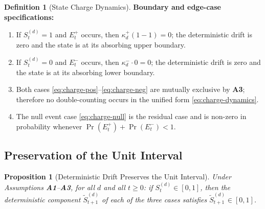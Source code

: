 \documentclass[12pt,openany]{book}
\numberwithin{equation}{chapter}
\theoremstyle{plain}
\newtheorem{proposition}[theorem]{Proposition}
\theoremstyle{definition}
\newtheorem{definition}[theorem]{Definition}
\theoremstyle{remark}
\def\mathcal#1{#1}%
\begin{document}
\begin{definition}[State Charge Dynamics]
\medskip
\noindent\textbf{Boundary and edge-case specifications:}
\begin{enumerate}
  \item If $\mathcal{S}_t^{(d)} = 1$ and $E_t^{+}$ occurs, then
    $\kappa_d^{+}(1 - 1) = 0$; the deterministic drift is zero
    and the state is at its absorbing upper boundary.
  \item If $\mathcal{S}_t^{(d)} = 0$ and $E_t^{-}$ occurs, then
    $\kappa_d^{-} \cdot 0 = 0$; the deterministic drift is zero
    and the state is at its absorbing lower boundary.
  \item Both cases \ref{eq:charge-pos}--\ref{eq:charge-neg} are
    mutually exclusive by \textbf{A3}; therefore no double-counting
    occurs in the unified form \eqref{eq:charge-dynamics}.
  \item The null event case \eqref{eq:charge-null} is the residual
    case and is non-zero in probability whenever
    $\Pr(E_t^{+}) + \Pr(E_t^{-}) < 1$.
\end{enumerate}
\end{definition}

\subsection{Preservation of the Unit Interval}
\label{subsec:unit-interval}

\begin{proposition}[Deterministic Drift Preserves the Unit Interval]
\label{prop:charge-bounded-det}
Under Assumptions \textbf{A1}--\textbf{A3}, for all $d$ and all
$t \geq 0$: if $\mathcal{S}_t^{(d)} \in [0,1]$, then the
deterministic component $\tilde{\mathcal{S}}_{t+1}^{(d)}$ of
each of the three cases satisfies
$\tilde{\mathcal{S}}_{t+1}^{(d)} \in [0,1]$.
\end{proposition}
\end{document}
